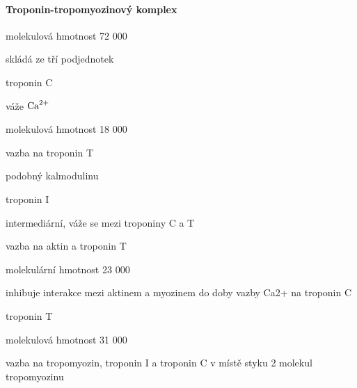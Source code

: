 \documentclass[DIV=8]{scrreprt}
\begin{document}
\paragraph{Troponin-tropomyozinový komplex}
\begin{myItemize}[nosep]
    \item molekulová hmotnost 72 000
    \item skládá ze tří podjednotek
\begin{myItemize}[nosep]
    \item troponin C
\begin{myItemize}[nosep]
    \item váže \(\ce{Ca^{2+}}\)
    \item molekulová hmotnost 18 000
    \item vazba na troponin T
    \item podobný kalmodulinu
\end{myItemize}

    \item troponin I
\begin{myItemize}[nosep]
    \item intermediární, váže se mezi troponiny C a T
\begin{myItemize}[nosep]
    \item vazba na aktin a troponin T
\end{myItemize}

    \item molekulární hmotnost 23 000
    \item inhibuje interakce mezi aktinem a myozinem do doby vazby Ca2+ na troponin C
\end{myItemize}

    \item troponin T
\begin{myItemize}[nosep]
    \item molekulová hmotnost 31 000
    \item vazba na tropomyozin, troponin I a troponin C v místě styku 2 molekul tropomyozinu
\end{myItemize}

\end{myItemize}

\end{myItemize}
\end{document}
